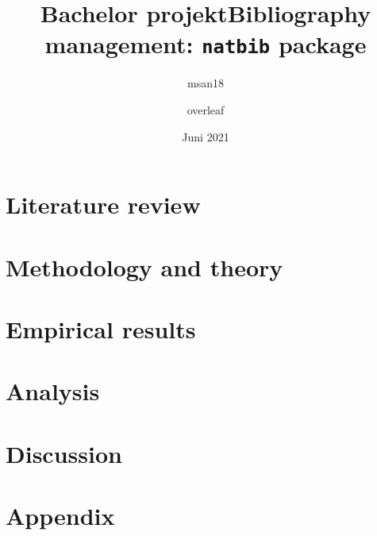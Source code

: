 \documentclass[danish ,a4paper,12pt]{article}
\title{Bachelor projekt}
\author{msan18 }
\date{Juni 2021}
\title{Bibliography management: \texttt{natbib} package}
\author{overleaf}
\date{}
\begin{document}
\linespread{1.5}

\frontmatter






\tableofcontents*	
\newpage


\renewcommand{\cleardoublepage}{\newpage}
\mainmatter


\vspace{1.5 cm}
\selectfont





\section{Literature review} \label{lit_rev}


\section{Methodology and theory} \label{sec:method}


\section{Empirical results} \label{sec:analysis}


\section{Analysis} \label{results}


\section{Discussion} \label{sec:discussion}

\pagebreak

 \renewcommand{\bibsection}{\section{Bibliography}}


\pagebreak

\appendix
{}


\section{Appendix} \label{sec:appendix}

\pagebreak
\end{document}
